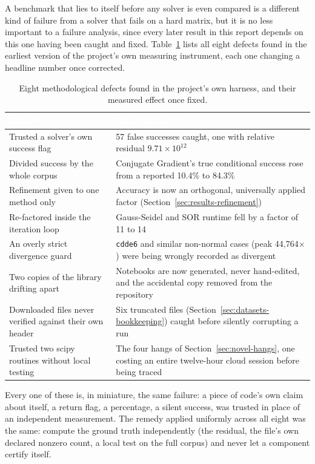 \documentclass[11pt,a4paper]{article}
\newcommand{\hdrow}{\rowcolor{SBnavy}}
\newcommand{\hdtxt}[1]{\textcolor{white}{\bfseries #1}}
\newcommand{\code}[1]{\texttt{\footnotesize #1}}
\begin{document}
A benchmark that lies to itself before any solver is even compared is a different kind of
failure from a solver that fails on a hard matrix, but it is no less important to a
failure analysis, since every later result in this report depends on this one having been
caught and fixed. Table~\ref{tab:mistakes} lists all eight defects found in the earliest
version of the project's own measuring instrument, each one changing a headline number
once corrected.

\begin{table}[H]
\centering
\caption{Eight methodological defects found in the project's own harness, and their
measured effect once fixed.}
\label{tab:mistakes}
\small
\begin{tabularx}{\linewidth}{p{4.6cm}X}
\toprule
\hdrow \hdtxt{Defect} & \hdtxt{Effect of the fix} \\
\midrule
Trusted a solver's own success flag & 57 false successes caught, one with relative
residual $9.71\times10^{12}$ \\
\rowcolor{SBlight} Divided success by the whole corpus & Conjugate Gradient's true
conditional success rose from a reported 10.4\% to 84.3\% \\
Refinement given to one method only & Accuracy is now an orthogonal, universally applied
factor (Section~\ref{sec:results-refinement}) \\
\rowcolor{SBlight} Re-factored inside the iteration loop & Gauss-Seidel and SOR runtime
fell by a factor of 11 to 14 \\
An overly strict divergence guard & \code{cdde6} and similar non-normal cases (peak
44,764$\times$) were being wrongly recorded as divergent \\
\rowcolor{SBlight} Two copies of the library drifting apart & Notebooks are now generated,
never hand-edited, and the accidental copy removed from the repository \\
Downloaded files never verified against their own header & Six truncated files
(Section~\ref{sec:datasets-bookkeeping}) caught before silently corrupting a run \\
\rowcolor{SBlight} Trusted two scipy routines without local testing & The four hangs of
Section~\ref{sec:novel-hangs}, one costing an entire twelve-hour cloud session before being
traced \\
\bottomrule
\end{tabularx}
\end{table}

Every one of these is, in miniature, the same failure: a piece of code's own claim about
itself, a return flag, a percentage, a silent success, was trusted in place of an
independent measurement. The remedy applied uniformly across all eight was the same:
compute the ground truth independently (the residual, the file's own declared nonzero
count, a local test on the full corpus) and never let a component certify itself.
\end{document}
